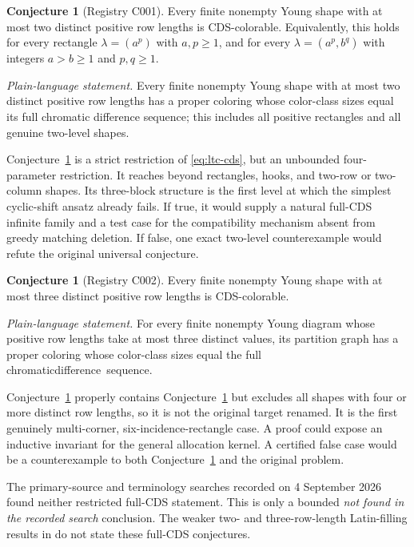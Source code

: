 \documentclass[11pt]{amsart}
\theoremstyle{definition}
\newtheorem{conjecture}[theorem]{Conjecture}
\begin{document}
\begin{conjecture}[Registry C001]\label{conj:C001}
Every finite nonempty Young shape with at most two distinct positive row lengths is CDS-colorable. Equivalently, this holds for every rectangle \(\lambda=(a^p)\) with \(a,p\ge 1\), and for every \(\lambda=(a^p,b^q)\) with integers \(a>b\ge 1\) and \(p,q\ge 1\).
\par\smallskip
\noindent\emph{Plain-language statement.} Every finite nonempty Young shape with at most two distinct positive row lengths has a proper coloring whose color-class sizes equal its full chromatic difference sequence; this includes all positive rectangles and all genuine two-level shapes.
\end{conjecture}

Conjecture~\ref{conj:C001} is a strict restriction of
\eqref{eq:ltc-cds}, but an unbounded four-parameter restriction.  It reaches
beyond rectangles, hooks, and two-row or two-column shapes.  Its three-block
structure is the first level at which the simplest cyclic-shift ansatz already
fails.  If true, it would supply a natural full-CDS infinite family and a test
case for the compatibility mechanism absent from greedy matching deletion.
If false, one exact two-level counterexample would refute the original
universal conjecture.

\begin{conjecture}[Registry C002]\label{conj:C002}
Every finite nonempty Young shape with at most three distinct positive row lengths is CDS-colorable.
\par\smallskip
\noindent\emph{Plain-language statement.} For every finite nonempty Young diagram whose positive row lengths take at most three distinct values, its partition graph has a proper coloring whose color-class sizes equal the full chromatic\linebreak \mbox{difference sequence}.
\end{conjecture}

Conjecture~\ref{conj:C002} properly contains
Conjecture~\ref{conj:C001} but excludes all shapes with four or more distinct
row lengths, so it is not the original target renamed.  It is the first
genuinely multi-corner, six-incidence-rectangle case.  A proof could expose
an inductive invariant for the general allocation kernel.  A certified false
case would be a counterexample to both Conjecture~\ref{conj:C002} and the
original problem.

The primary-source and terminology searches recorded on 4 September 2026
found neither restricted full-CDS statement.  This is only a bounded
\emph{not found in the recorded search} conclusion.  The weaker two- and
three-row-length Latin-filling results in
\cite{ChowFanGoemansVondrak2003,AllsopKotlarWanless2025} do not state these
full-CDS conjectures.
\end{document}
